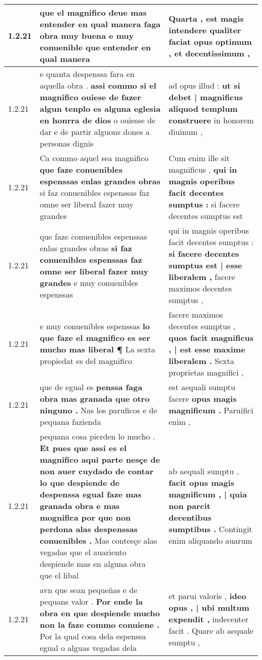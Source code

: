 \begin{tabular}{|p{1cm}|p{6.5cm}|p{6.5cm}|}
1.2.21 & que el magnifico deue mas entender \textbf{ en qual manera faga obra muy buena } e muy conuenible que entender en qual manera & Quarta , est magis intendere qualiter faciat \textbf{ opus optimum , } et decentissimum , \\\hline
1.2.21 & e quanta despenssa fara en aquella obra . \textbf{ assi commo si el magnifico ouiese de fazer algun tenplo es alguna eglesia en honrra de dios } o ouiesse de dar e de partir alguons dones a personas dignis & ad opus illud : \textbf{ ut si debet | magnificus aliquod templum construere } in honorem diuinum , \\\hline
1.2.21 & Ca commo aquel sea magnifico \textbf{ que faze conuenibles espenssas enlas grandes obras } si faz conuenibles espenssas faz omne ser liberal fazer muy grandes & Cum enim ille sit magnificus , \textbf{ qui in magnis operibus facit decentes sumptus : } si facere decentes sumptus est \\\hline
1.2.21 & que faze conuenibles espenssas enlas grandes obras \textbf{ si faz conuenibles espenssas faz omne ser liberal fazer muy grandes } e muy conuenibles espenssas & qui in magnis operibus facit decentes sumptus : \textbf{ si facere decentes sumptus est | esse liberalem , } facere maximos decentes sumptus , \\\hline
1.2.21 & e muy conuenibles espenssas \textbf{ lo que faze el magnifico es ser mucho mas liberal ¶ } La sexta propiedat es del magnifico & facere maximos decentes sumptus , \textbf{ quos facit magnificus , | est esse maxime liberalem . } Sexta proprietas magnifici , \\\hline
1.2.21 & que de egual es \textbf{ penssa faga obra mas granada que otro ninguno . } Nas los paruficos e de pequana fazienda & est aequali sumptu facere \textbf{ opus magis magnificum . } Paruifici enim , \\\hline
1.2.21 & pequana cosa pierden lo mucho . \textbf{ Et pues que assi es el magnifico aqui parte nesçe de non auer cuydado de contar lo que despiende de despenssa egual faze mas granada obra e mas mognifica por que non perdona alas despenssas conuenibles . } Mas contesçe alas vegadas que el auariento despiende mas en alguna obra que el libal & ab aequali sumptu , \textbf{ facit opus magis magnificum , | quia non parcit decentibus sumptibus . } Contingit enim aliquando auarum \\\hline
1.2.21 & avn que sean pequeñas e de pequans valor . \textbf{ Por ende la obra en que despiende mucho non la faze commo conuiene . } Por la qual cosa dela espenssa egual o alguas vegadas dela & et parui valoris , \textbf{ ideo opus , | ubi multum expendit , } indecenter facit . Quare ab aequale sumptu , \\\hline

\end{tabular}
